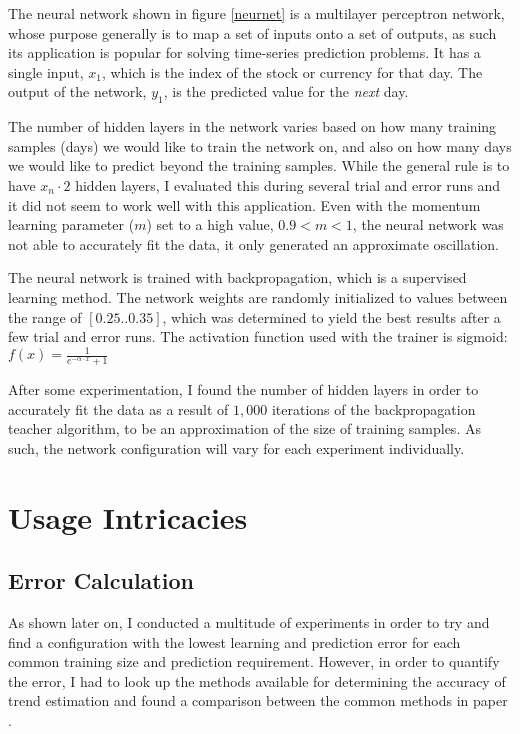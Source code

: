 \documentclass[a4paper,12pt]{article}
\begin{document}
	The neural network shown in figure \ref{neurnet} is a multilayer perceptron network, whose purpose generally is to map a set of inputs onto a set of outputs, as such its application is popular for solving time-series prediction problems. It has a single input, $x_1$, which is the index of the stock or currency for that day. The output of the network, $y_1$, is the predicted value for the \textit{next} day.
	
	The number of hidden layers in the network varies based on how many training samples (days) we would like to train the network on, and also on how many days we would like to predict beyond the training samples. While the general rule is to have $x_n \cdot 2$ hidden layers, I evaluated this during several trial and error runs and it did not seem to work well with this application. Even with the momentum learning parameter ($m$) set to a high value, $0.9 < m < 1$, the neural network was not able to accurately fit the data, it only generated an approximate oscillation.
	
	The neural network is trained with backpropagation, which is a supervised learning method. The network weights are randomly initialized to values between the range of $[0.25..0.35]$, which was determined to yield the best results after a few trial and error runs. The activation function used with the trainer is sigmoid: $f(x) = \frac{1}{e^{-\alpha \cdot x} + 1}$
	
	After some experimentation, I found the number of hidden layers in order to accurately fit the data as a result of $1,000$ iterations of the backpropagation teacher algorithm, to be an approximation of the size of training samples. As such, the network configuration will vary for each experiment individually.

\section{Usage Intricacies}
\subsection{Error Calculation} \label{mape}

	As shown later on, I conducted a multitude of experiments in order to try and find a configuration with the lowest learning and prediction error for each common training size and prediction requirement. However, in order to quantify the error, I had to look up the methods available for determining the accuracy of trend estimation and found a comparison between the common methods in paper \cite{armstrong1992error}.
	
\end{document}
